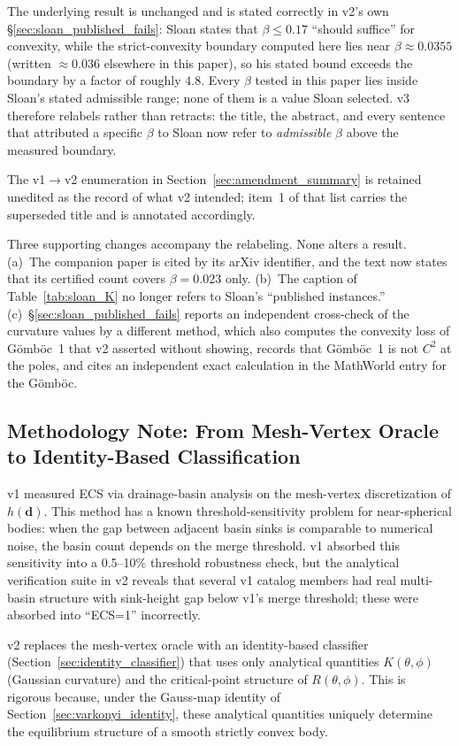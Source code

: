 \documentclass[11pt,a4paper]{article}
\begin{document}
The underlying result is unchanged and is stated correctly in v2's
own \S\ref{sec:sloan_published_fails}: Sloan states that
$\beta \le 0.17$ ``should suffice'' for convexity, while the
strict-convexity boundary computed here lies near
$\beta \approx 0.0355$ (written $\approx 0.036$ elsewhere in this
paper), so his stated bound exceeds the boundary by a factor of
roughly $4.8$. Every
$\beta$ tested in this paper lies inside Sloan's stated admissible
range; none of them is a value Sloan selected. v3 therefore
relabels rather than retracts: the title, the abstract, and every
sentence that attributed a specific $\beta$ to Sloan now refer to
\emph{admissible} $\beta$ above the measured boundary.

The v1$\to$v2 enumeration in
Section~\ref{sec:amendment_summary} is retained unedited as the
record of what v2 intended; item~1 of that list carries the
superseded title and is annotated accordingly.

Three supporting changes accompany the relabeling. None alters a
result. (a)~The companion paper is cited by its arXiv identifier, and
the text now states that its certified count covers $\beta = 0.023$
only. (b)~The caption of Table~\ref{tab:sloan_K} no longer refers to
Sloan's ``published instances.'' (c)~\S\ref{sec:sloan_published_fails}
reports an independent cross-check of the curvature values by a
different method, which also computes the convexity loss of
G\"omb\"oc~1 that v2 asserted without showing, records that
G\"omb\"oc~1 is not $C^2$ at the poles, and cites an independent exact
calculation in the MathWorld entry for the G\"omb\"oc.

\subsection{Methodology Note: From Mesh-Vertex Oracle to Identity-Based Classification}

v1 measured ECS via drainage-basin analysis on the mesh-vertex
discretization of $h(\mathbf{d})$. This method has a known
threshold-sensitivity problem for near-spherical bodies: when the
gap between adjacent basin sinks is comparable to numerical noise,
the basin count depends on the merge threshold. v1 absorbed this
sensitivity into a 0.5--10\% threshold robustness check, but the
analytical verification suite in v2 reveals that several v1
catalog members had real multi-basin structure with sink-height
gap below v1's merge threshold; these were absorbed into ``ECS=1''
incorrectly.

v2 replaces the mesh-vertex oracle with an identity-based
classifier (Section~\ref{sec:identity_classifier}) that uses only
analytical quantities $K(\theta,\phi)$ (Gaussian curvature) and the
critical-point structure of $R(\theta,\phi)$. This is rigorous
because, under the Gauss-map identity of
Section~\ref{sec:varkonyi_identity}, these analytical quantities
uniquely determine the equilibrium structure of a smooth strictly
convex body.
\end{document}
